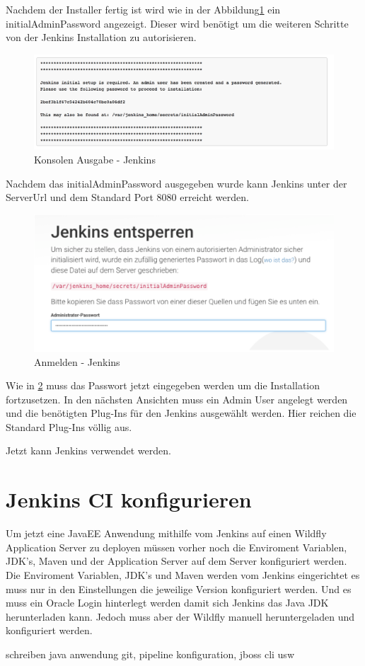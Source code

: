 Nachdem der Installer fertig ist wird wie in der Abbildung\ref{img:consoleoutput} ein initialAdminPassword angezeigt. Dieser wird benötigt um die weiteren Schritte von der Jenkins Installation zu autorisieren.

\begin{figure}[h]
\centering
\includegraphics[width=1\textwidth]{images/09_CI/consoleOutput.png}
\caption{Konsolen Ausgabe - Jenkins}
\label{img:consoleoutput}
\end{figure}

Nachdem das initialAdminPassword ausgegeben wurde kann Jenkins unter der ServerUrl  und dem Standard Port 8080 erreicht werden. 

\begin{figure}[h]
\centering
\includegraphics[width=1\textwidth]{images/09_CI/initial.png}
\caption{Anmelden - Jenkins}
\label{img:login}
\end{figure}

Wie in \ref{img:login} muss das Passwort jetzt eingegeben werden um die Installation fortzusetzen. In den nächsten Ansichten muss ein Admin User angelegt werden und die benötigten Plug-Ins für den Jenkins ausgewählt werden. Hier reichen die Standard Plug-Ins völlig aus.

Jetzt kann Jenkins verwendet werden.

\section{Jenkins CI konfigurieren}
\label{sec:jenkinsconfiguration}
Um jetzt eine JavaEE Anwendung mithilfe vom Jenkins auf einen Wildfly Application Server zu deployen müssen vorher noch die Enviroment Variablen, JDK's, Maven und der Application Server auf dem Server konfiguriert werden. Die Enviroment Variablen, JDK's und Maven werden vom Jenkins eingerichtet es muss nur in den Einstellungen die jeweilige Version konfiguriert werden. Und es muss ein Oracle Login hinterlegt werden damit sich Jenkins das Java JDK herunterladen kann. Jedoch muss aber der Wildfly manuell heruntergeladen und konfiguriert werden.

schreiben java anwendung git, pipeline konfiguration, jboss cli usw


